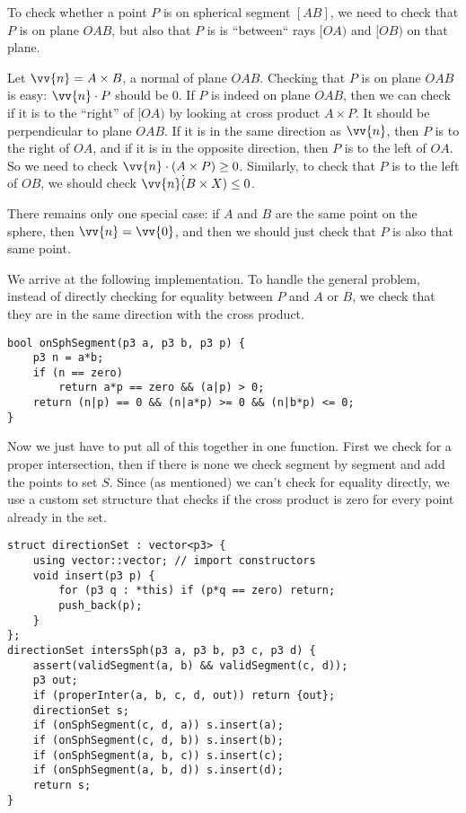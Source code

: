
To check whether a point $P$ is on spherical segment $[AB]$, we need to check that $P$ is on plane $OAB$, but also that $P$ is is ``between`` rays $[OA)$ and $[OB)$ on that plane.

Let $\vv{n} = A \times B$, a normal of plane $OAB$. Checking that $P$ is on plane $OAB$ is easy: $\vv{n}\cdot P$ should be 0. If $P$ is indeed on plane $OAB$, then we can check if it is to the ``right'' of $[OA)$ by looking at cross product $A \times P$. It should be perpendicular to plane $OAB$. If it is in the same direction as $\vv{n}$, then $P$ is to the right of $OA$, and if it is in the opposite direction, then $P$ is to the left of $OA$. So we need to check $\vv{n} \cdot (A \times P) \geq 0$.
Similarly, to check that $P$ is to the left of $OB$, we should check $\vv{n} \dot (B \times X) \leq 0$.


There remains only one special case: if $A$ and $B$ are the same point on the sphere, then $\vv{n}=\vv{0}$, and then we should just check that $P$ is also that same point.

We arrive at the following implementation. To handle the general problem, instead of directly checking for equality between $P$ and $A$ or $B$, we check that they are in the same direction with the cross product.
\begin{lstlisting}
bool onSphSegment(p3 a, p3 b, p3 p) {
    p3 n = a*b;
    if (n == zero)
        return a*p == zero && (a|p) > 0;
    return (n|p) == 0 && (n|a*p) >= 0 && (n|b*p) <= 0;
}
\end{lstlisting}

Now we just have to put all of this together in one function. First we check for a proper intersection, then if there is none we check segment by segment and add the points to set $S$. Since (as mentioned) we can't check for equality directly, we use a custom set structure that checks if the cross product is zero for every point already in the set.
\begin{lstlisting}
struct directionSet : vector<p3> {
    using vector::vector; // import constructors
    void insert(p3 p) {
        for (p3 q : *this) if (p*q == zero) return;
        push_back(p);
    }
};
directionSet intersSph(p3 a, p3 b, p3 c, p3 d) {
    assert(validSegment(a, b) && validSegment(c, d));
    p3 out;
    if (properInter(a, b, c, d, out)) return {out};
    directionSet s;
    if (onSphSegment(c, d, a)) s.insert(a);
    if (onSphSegment(c, d, b)) s.insert(b);
    if (onSphSegment(a, b, c)) s.insert(c);
    if (onSphSegment(a, b, d)) s.insert(d);
    return s;
}
\end{lstlisting}
